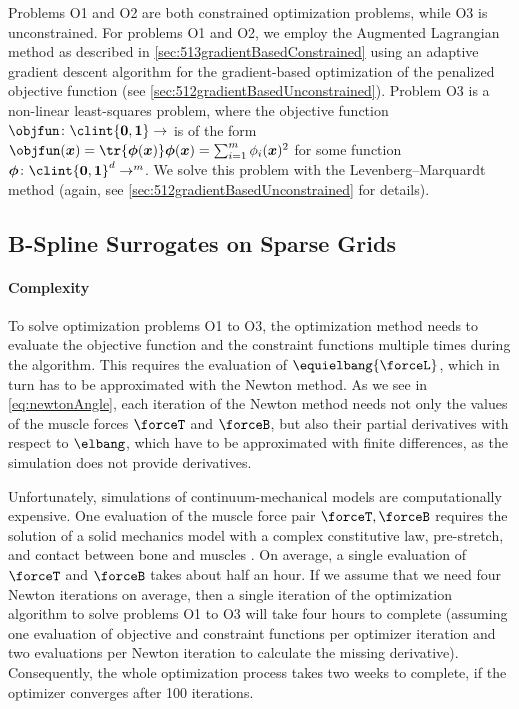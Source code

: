 Problems O1 and O2 are both constrained optimization problems,
while O3 is unconstrained.
For problems O1 and O2, we employ the Augmented Lagrangian method as
described in \cref{sec:513gradientBasedConstrained}
using an adaptive gradient descent algorithm
for the gradient-based optimization of the penalized objective function
(see \cref{sec:512gradientBasedUnconstrained}).
Problem O3 is a non-linear least-squares problem,
where the objective function $\objfun\colon \clint{\*0, \*1} \to \real$
is of the form
$\objfun(\*x) = \tr{\*\phi(\*x)} \*\phi(\*x) = \sum_{i=1}^m \phi_i(\*x)^2$
for some function $\*\phi\colon \clint{\*0, \*1}^d \to \real^m$.
We solve this problem with the Levenberg--Marquardt method
(again, see \cref{sec:512gradientBasedUnconstrained} for details).



\subsection{B-Spline Surrogates on Sparse Grids}
\label{sec:723surrogates}

\paragraph{Complexity}

To solve optimization problems O1 to O3,
the optimization method needs to evaluate the objective function
and the constraint functions multiple times during the algorithm.
This requires the evaluation of $\equielbang{\forceL}$,
which in turn has to be approximated with the Newton method.
As we see in \cref{eq:newtonAngle},
each iteration of the Newton method needs not only the values of the
muscle forces $\forceT$ and $\forceB$, but also their
partial derivatives with respect to $\elbang$,
which have to be approximated with finite differences,
as the simulation does not provide derivatives.

Unfortunately, simulations of continuum-mechanical models are
computationally expensive.
One evaluation of the muscle force pair $\forceT, \forceB$
requires the solution of a solid mechanics model
with a complex constitutive law, pre-stretch, and contact between
bone and muscles \cite{Valentin18Gradient}.
On average, a single evaluation of $\forceT$ and $\forceB$ takes
about half an hour.
%
If we assume that we need four Newton iterations on average,
then a single iteration of the optimization algorithm to solve
problems O1 to O3 will take four hours to complete
(assuming one evaluation of objective and constraint functions
per optimizer iteration and
two evaluations per Newton iteration to calculate the missing derivative).
Consequently, the whole optimization process takes
two weeks to complete, if the optimizer converges after 100 iterations.

